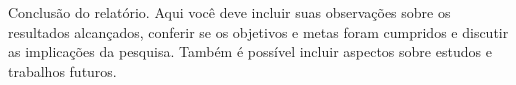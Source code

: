 
Conclusão do relatório. Aqui você deve incluir suas observações sobre os resultados alcançados, conferir se os objetivos e metas foram cumpridos e discutir as implicações da pesquisa. Também é possível incluir aspectos sobre estudos e trabalhos futuros.

\lipsum[5-8]
